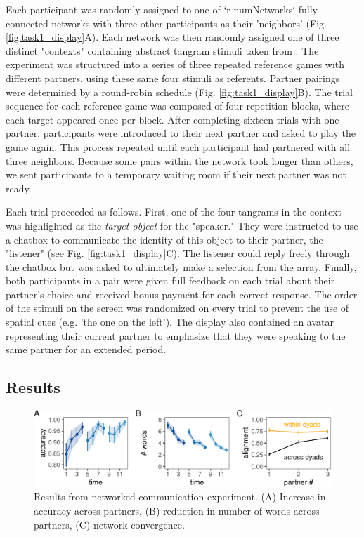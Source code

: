 Each participant was randomly assigned to one of `r numNetworks` fully-connected networks with three other participants as their 'neighbors' (Fig. \ref{fig:task1_display}A). 
Each network was then randomly assigned one of three distinct "contexts" containing abstract tangram stimuli taken from .
The experiment was structured into a series of three repeated reference games with different partners, using these same four stimuli as referents.
Partner pairings were determined by a round-robin schedule (Fig. \ref{fig:task1_display}B).
The trial sequence for each reference game was composed of four repetition blocks, where each target appeared once per block.
After completing sixteen trials with one partner, participants were introduced to their next partner and asked to play the game again. 
This process repeated until each participant had partnered with all three neighbors.
Because some pairs within the network took longer than others, we sent participants to a temporary waiting room if their next partner was not ready. 

Each trial proceeded as follows.
First, one of the four tangrams in the context was highlighted as the \emph{target object} for the "speaker." 
They were instructed to use a chatbox to communicate the identity of this object to their partner, the "listener" (see Fig. \ref{fig:task1_display}C).
The listener could reply freely through the chatbox but was asked to ultimately make a selection from the array. 
Finally, both participants in a pair were given full feedback on each trial about their partner's choice and received bonus payment for each correct response. 
The order of the stimuli on the screen was randomized on every trial to prevent the use of spatial cues (e.g. 'the one on the left').
The display also contained an avatar representing their current partner to emphasize that they were speaking to the same partner for an extended period.

\subsection{Results}

\begin{figure}
\includegraphics[scale=1]{./figures/sec3-empirical-results.pdf}
\caption{Results from networked communication experiment. (A) Increase in accuracy across partners, (B) reduction in number of words across partners, (C) network convergence.}
\label{fig:results}
\end{figure}

